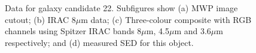 \documentclass[times,usenatbib]{mn2e}
\begin{document}
\begin{figure}
\begin{center}
\caption{Data for galaxy candidate 22. Subfigures show (a) MWP image cutout; (b) IRAC 8$\mu$m data; (c) Three-colour composite with RGB channels using Spitzer IRAC bands 8$\mu$m, 4.5$\mu$m and 3.6$\mu$m respectively; and (d) measured SED for this object.}
\label{gal22}
\end{center}
\end{figure} 
\end{document}
